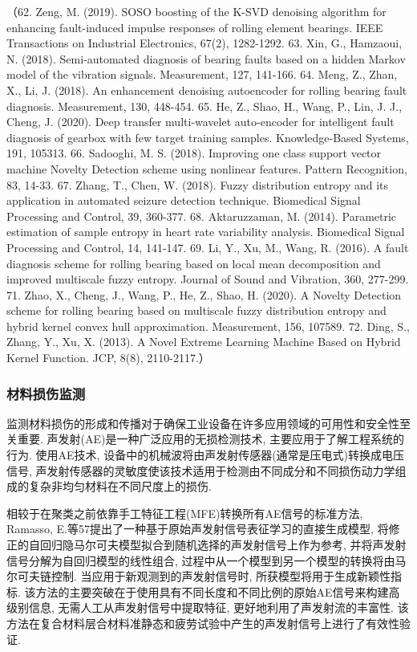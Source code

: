 \documentclass{Style/aas}
\begin{document}
\begin{multicols}{2}
  （62.	Zeng, M. (2019). SOSO boosting of the K-SVD denoising algorithm for enhancing fault-induced impulse responses of rolling element bearings. IEEE Transactions on Industrial Electronics, 67(2), 1282-1292.
  63.	Xin, G., Hamzaoui, N. (2018). Semi-automated diagnosis of bearing faults based on a hidden Markov model of the vibration signals. Measurement, 127, 141-166.
  64.	Meng, Z., Zhan, X., Li, J. (2018). An enhancement denoising autoencoder for rolling bearing fault diagnosis. Measurement, 130, 448-454.
  65.	He, Z., Shao, H., Wang, P., Lin, J. J., Cheng, J. (2020). Deep transfer multi-wavelet auto-encoder for intelligent fault diagnosis of gearbox with few target training samples. Knowledge-Based Systems, 191, 105313.
  66.	Sadooghi, M. S. (2018). Improving one class support vector machine Novelty Detection scheme using nonlinear features. Pattern Recognition, 83, 14-33.
  67.	Zhang, T., Chen, W. (2018). Fuzzy distribution entropy and its application in automated seizure detection technique. Biomedical Signal Processing and Control, 39, 360-377.
  68.	Aktaruzzaman, M. (2014). Parametric estimation of sample entropy in heart rate variability analysis. Biomedical Signal Processing and Control, 14, 141-147.
  69.	Li, Y., Xu, M., Wang, R. (2016). A fault diagnosis scheme for rolling bearing based on local mean decomposition and improved multiscale fuzzy entropy. Journal of Sound and Vibration, 360, 277-299.
  71.	Zhao, X., Cheng, J., Wang, P., He, Z., Shao, H. (2020). A Novelty Detection scheme for rolling bearing based on multiscale fuzzy distribution entropy and hybrid kernel convex hull approximation. Measurement, 156, 107589.
  72.	Ding, S., Zhang, Y., Xu, X. (2013). A Novel Extreme Learning Machine Based on Hybrid Kernel Function. JCP, 8(8), 2110-2117.）

  \subsubsection{材料损伤监测}
  监测材料损伤的形成和传播对于确保工业设备在许多应用领域的可用性和安全性至关重要. 声发射(AE)是一种广泛应用的无损检测技术, 主要应用于了解工程系统的行为. 使用AE技术, 设备中的机械波将由声发射传感器(通常是压电式)转换成电压信号, 声发射传感器的灵敏度使该技术适用于检测由不同成分和不同损伤动力学组成的复杂非均匀材料在不同尺度上的损伤.

  相较于在聚类之前依靠手工特征工程(MFE)转换所有AE信号的标准方法, Ramasso, E.等57提出了一种基于原始声发射信号表征学习的直接生成模型, 将修正的自回归隐马尔可夫模型拟合到随机选择的声发射信号上作为参考, 并将声发射信号分解为自回归模型的线性组合, 过程中从一个模型到另一个模型的转换将由马尔可夫链控制. 当应用于新观测到的声发射信号时, 所获模型将用于生成新颖性指标. 该方法的主要突破在于使用具有不同长度和不同比例的原始AE信号来构建高级别信息, 无需人工从声发射信号中提取特征, 更好地利用了声发射流的丰富性. 该方法在复合材料层合材料准静态和疲劳试验中产生的声发射信号上进行了有效性验证.


\end{multicols}
\end{document}
